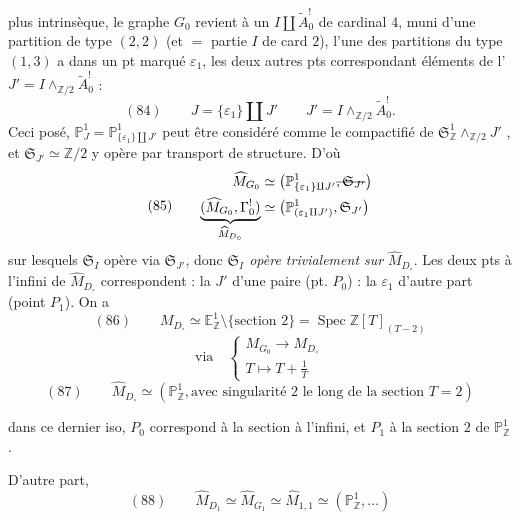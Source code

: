 \documentclass[11pt,a4paper]{article}
\begin{document}
plus intrinsèque, le graphe $G_0$  revient à un $I \amalg \widetilde{A}^{!}_0$ de cardinal $4$, muni d'une partition de type $(2,2)$ (et $=$  partie $I$ de card $2$), l'une des  partitions du type $(1,3)$ a dans un pt marqué $\varepsilon_1$, les deux autres pts correspondant  éléments de l' $J' = I \wedge_{\mathbb{Z}/2} \widetilde{A}^{!}_0$ :
\[
(84)\qquad J = \{\varepsilon_1\} \amalg J' \qquad J' = I \wedge_{\mathbb{Z}/2} \widetilde{A}^{!}_0 .
\]
Ceci posé, $\mathbb{P}^1_J = \mathbb{P}^1_{\{\varepsilon_1\} \amalg J'}$ \struck{\ill{}} peut être considéré comme le compactifié de $\mathfrak{S}^{1}_{\mathbb{Z}} \wedge_{\mathbb{Z}/2} J'$ , et $\mathfrak{S}_{J'} \simeq \mathbb{Z}/2$ y opère par transport de structure. D'où
\[
(85)\qquad
\begin{aligned}
\widehat{M}_{G_0} &\simeq \bigl(\mathbb{P}^1_{\{\varepsilon_1\} \amalg J'}\text{\struck{$, \mathfrak{S}_{J'}$}}\bigr) \\
\underbrace{(\widehat{M}_{G_0}, \Gamma^{!}_0)}_{\widehat{M}_{D_{\circ}}} &\simeq \bigl(\mathbb{P}^1_{(\varepsilon_1 \amalg J')}, \mathfrak{S}_{J'}\bigr)
\end{aligned}
\]
sur lesquels $\mathfrak{S}_I$ opère via $\mathfrak{S}_{J'}$, donc \emph{$\mathfrak{S}_I$ opère trivialement sur} $\widehat{M}_{D_{\circ}}$. Les deux pts à l'infini de $\widehat{M}_{D_{\circ}}$ correspondent : la  $J'$ d'une paire (pt. $P_0$) : la  $\varepsilon_1$ d'autre part (point $P_1$). On a
\[
(86)\qquad M_{D_{\circ}} \simeq \mathbb{E}^1_{\mathbb{Z}} \setminus \{\text{section } 2\} = \operatorname{Spec} \mathbb{Z}[T]_{(T-2)}
\]
\[
\text{via}\quad
\begin{cases}
M_{G_0} \longrightarrow M_{D_{\circ}} \\
T \longmapsto T + \frac{1}{T}
\end{cases}
\]
\[
(87)\qquad \widehat{M}_{D_{\circ}} \simeq (\mathbb{P}^1_{\mathbb{Z}}, \text{avec singularité } 2 \text{ le long de la section } T = 2)
\]

dans ce dernier iso, $P_0$ correspond à la section à l'infini, et $P_1$ à la section $2$ de $\mathbb{P}^1_{\mathbb{Z}}$.

D'autre part,
\[
(88)\qquad \widehat{M}_{D_1} \simeq \widehat{M}_{G_1} \simeq \widehat{M}_{1,1} \simeq (\mathbb{P}^1_{\mathbb{Z}}, \ldots)
\]
\end{document}
